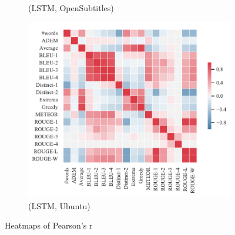 \begin{figure}[htbp]
\begin{subfigure}{0.33\linewidth}
        \caption{(LSTM, OpenSubtitles)}
    \end{subfigure}%
    \begin{subfigure}{0.33\linewidth}
        \centering
        \includegraphics[width=\linewidth]{figure/plot/heatmap/v4/pearson/lstm/ubuntu/plot.pdf}
        \caption{(LSTM, Ubuntu)}
    \end{subfigure}
    \caption{Heatmaps of Pearson's r}
    \label{fig:corr_heatmap}
\end{figure}
